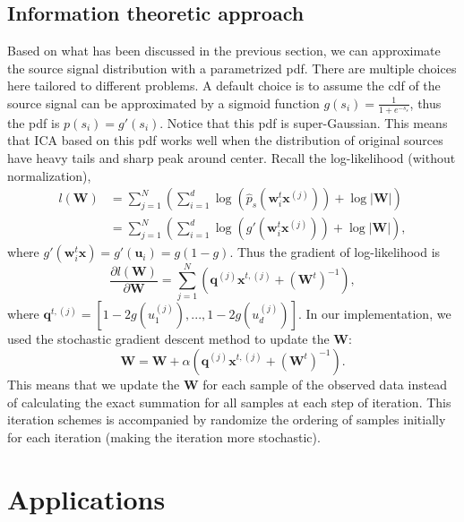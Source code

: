 \documentclass[aps,prl,preprint,superscriptaddress]{revtex4-2}
\begin{document}
\subsection{Information theoretic approach}
Based on what has been discussed in the previous section, we can approximate the source signal distribution with a parametrized pdf. There are multiple choices here tailored to different problems. A default choice is to assume the cdf of the source signal can be approximated by a sigmoid function $g(s_{i}) = \frac{1}{1+e^{-s_{s}}}$, thus the pdf is $p(s_{i}) = g'(s_{i})$. Notice that this pdf is super-Gaussian. This means that ICA based on this pdf works well when the distribution of original sources have heavy tails and sharp peak around center. Recall the log-likelihood (without normalization), 
\begin{align}
l(\mathbf{W}) &= \sum_{j=1}^{N}(\sum_{i=1}^{d}\log(\hat{p}_{s}(\mathbf{w}_{i}^{t}\mathbf{x}^{(j)}))+\log|\mathbf{W}|) \\
&= \sum_{j=1}^{N}(\sum_{i=1}^{d}\log(g'(\mathbf{w}_{i}^{t}\mathbf{x}^{(j)}))+\log|\mathbf{W}|),
\end{align} where $g'(\mathbf{w}_{i}^{t}\mathbf{x}) = g'(\mathbf{u}_{i}) = g(1-g)$. Thus the gradient of log-likelihood is 
\begin{equation}
\frac{\partial l(\mathbf{W})}{\partial \mathbf{W}} = \sum_{j=1}^{N}(\mathbf{q}^{(j)}\mathbf{x}^{t, (j)} + (\mathbf{W}^{t})^{-1}),
\end{equation} where $\mathbf{q}^{t, (j)} = [1-2g(u_{1}^{(j)}), ... ,1-2g(u_{d}^{(j)}) ]$. 
In our implementation, we used the stochastic gradient descent method to update the $\mathbf{W}$:
\begin{equation}
\mathbf{W} = \mathbf{W} + \alpha (\mathbf{q}^{(j)}\mathbf{x}^{t, (j)} + (\mathbf{W}^{t})^{-1}).
\end{equation} This means that we update the $\mathbf{W}$ for each sample of the observed data instead of calculating the exact summation for all samples at each step of iteration. This iteration schemes is accompanied by randomize the ordering of samples initially for each iteration (making the iteration more stochastic). 
\section{Applications}
\end{document}
